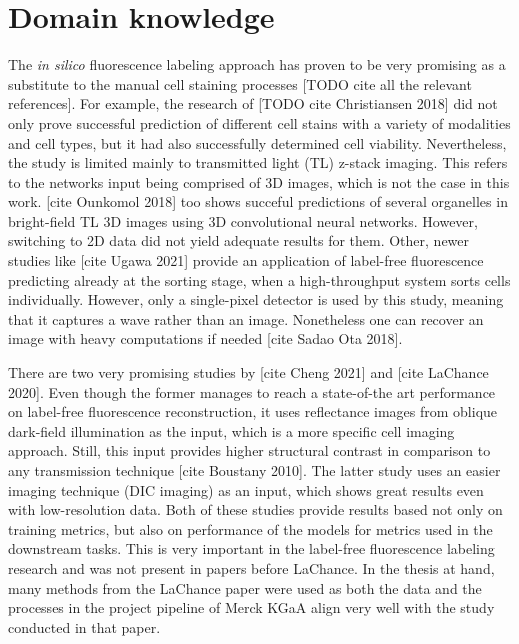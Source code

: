 \section{Domain knowledge}

    The \textit{in silico} fluorescence labeling approach has proven to be very promising as a substitute to the manual cell staining processes [TODO cite all the relevant references]. For example, the research of [TODO cite Christiansen 2018] did not only prove successful prediction of different cell stains with a variety of modalities and cell types, but it had also successfully determined cell viability. Nevertheless, the study is limited mainly to transmitted light (TL) z-stack imaging. This refers to the networks input being comprised of 3D images, which is not the case in this work. [cite Ounkomol 2018] too shows succeful predictions of several organelles in bright-field TL 3D images using 3D convolutional neural networks. However, switching to 2D data did not yield adequate results for them. Other, newer studies like [cite Ugawa 2021] provide an application of label-free fluorescence predicting already at the sorting stage, when a high-throughput system sorts cells individually. However, only a single-pixel detector is used by this study, meaning that it captures a wave rather than an image. Nonetheless one can recover an image with heavy computations if needed [cite Sadao Ota 2018].
    
    There are two very promising studies by [cite Cheng 2021] and [cite LaChance 2020]. Even though the former manages to reach a state-of-the art performance on label-free fluorescence reconstruction, it uses reflectance images from oblique dark-field illumination as the input, which is a more specific cell imaging approach. Still, this input provides higher structural contrast in comparison to any transmission technique [cite Boustany 2010]. The latter study uses an easier imaging technique (DIC imaging) as an input, which shows great results even with low-resolution data. Both of these studies provide results based not only on training metrics, but also on performance of the models for metrics used in the downstream tasks. This is very important in the label-free fluorescence labeling research and was not present in papers before LaChance. In the thesis at hand, many methods from the LaChance paper were used as both the data and the processes in the project pipeline of Merck KGaA align very well with the study conducted in that paper.
    
